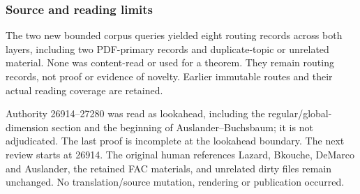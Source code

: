 \subsubsection{Source and reading limits}\label{algebra-proof-022-source-and-reading-limits}

The two new bounded corpus queries yielded eight routing records across both layers, including two PDF-primary records and duplicate-topic or unrelated material. None was content-read or used for a theorem. They remain routing records, not proof or evidence of novelty. Earlier immutable routes and their actual reading coverage are retained.

Authority 26914--27280 was read as lookahead, including the regular/global-dimension section and the beginning of Auslander--Buchsbaum; it is not adjudicated. The last proof is incomplete at the lookahead boundary. The next review starts at 26914. The original human references Lazard, Bkouche, DeMarco and Auslander, the retained FAC materials, and unrelated dirty files remain unchanged. No translation/source mutation, rendering or publication occurred.
